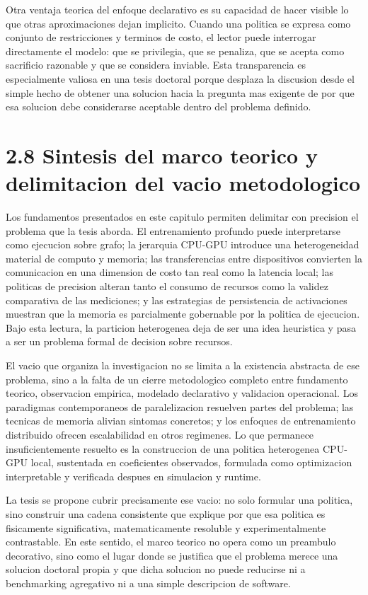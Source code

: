 Otra ventaja teorica del enfoque declarativo es su capacidad de hacer visible lo que otras aproximaciones dejan implicito. Cuando una politica se expresa como conjunto de restricciones y terminos de costo, el lector puede interrogar directamente el modelo: que se privilegia, que se penaliza, que se acepta como sacrificio razonable y que se considera inviable. Esta transparencia es especialmente valiosa en una tesis doctoral porque desplaza la discusion desde el simple hecho de obtener una solucion hacia la pregunta mas exigente de por que esa solucion debe considerarse aceptable dentro del problema definido.

\section{2.8 Sintesis del marco teorico y delimitacion del vacio metodologico}
Los fundamentos presentados en este capitulo permiten delimitar con precision el problema que la tesis aborda. El entrenamiento profundo puede interpretarse como ejecucion sobre grafo; la jerarquia CPU-GPU introduce una heterogeneidad material de computo y memoria; las transferencias entre dispositivos convierten la comunicacion en una dimension de costo tan real como la latencia local; las politicas de precision alteran tanto el consumo de recursos como la validez comparativa de las mediciones; y las estrategias de persistencia de activaciones muestran que la memoria es parcialmente gobernable por la politica de ejecucion. Bajo esta lectura, la particion heterogenea deja de ser una idea heuristica y pasa a ser un problema formal de decision sobre recursos.

El vacio que organiza la investigacion no se limita a la existencia abstracta de ese problema, sino a la falta de un cierre metodologico completo entre fundamento teorico, observacion empirica, modelado declarativo y validacion operacional. Los paradigmas contemporaneos de paralelizacion resuelven partes del problema; las tecnicas de memoria alivian sintomas concretos; y los enfoques de entrenamiento distribuido ofrecen escalabilidad en otros regimenes. Lo que permanece insuficientemente resuelto es la construccion de una politica heterogenea CPU-GPU local, sustentada en coeficientes observados, formulada como optimizacion interpretable y verificada despues en simulacion y runtime.

La tesis se propone cubrir precisamente ese vacio: no solo formular una politica, sino construir una cadena consistente que explique por que esa politica es fisicamente significativa, matematicamente resoluble y experimentalmente contrastable. En este sentido, el marco teorico no opera como un preambulo decorativo, sino como el lugar donde se justifica que el problema merece una solucion doctoral propia y que dicha solucion no puede reducirse ni a benchmarking agregativo ni a una simple descripcion de software.

